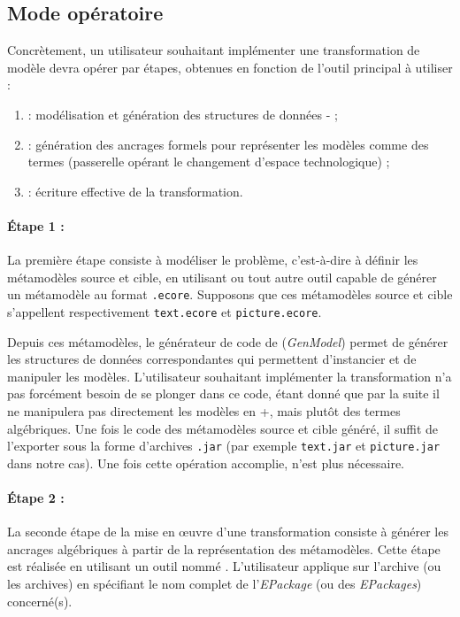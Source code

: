 \subsection{Mode opératoire}

Concrètement, un utilisateur souhaitant implémenter une transformation de
modèle devra opérer par étapes, obtenues en fonction de l'outil principal à
utiliser :
\begin{enumerate}

  \item {\eclipse} : modélisation et génération des structures de données
    {\java-\emf} ;

  \item {\tomemf} : génération des ancrages formels pour représenter les
    modèles comme des termes (passerelle opérant le changement d'espace
    technologique) ;

  \item {\tomjava} : écriture effective de la transformation.

\end{enumerate}

\paragraph{Étape 1 :} La première étape consiste à modéliser le problème,
c'est-à-dire à définir les métamodèles source et cible, en utilisant {\eclipse}
ou tout autre outil capable de générer un métamodèle au format \texttt{.ecore}.
Supposons que ces métamodèles source et cible s'appellent respectivement
\texttt{text.ecore} et \texttt{picture.ecore}.

Depuis ces métamodèles, le générateur de code de {\emf} (\emph{GenModel})
permet de générer les structures de données {\java} correspondantes qui
permettent d'instancier et de manipuler les modèles. L'utilisateur souhaitant
implémenter la transformation n'a pas forcément besoin de se plonger dans ce
code, étant donné que par la suite il ne manipulera pas directement les
modèles en {\java+\emf}, mais plutôt des termes algébriques. Une fois le
code des métamodèles source et cible généré, il suffit de l'exporter sous la
forme d'archives \texttt{.jar} (par exemple \texttt{text.jar} et
\texttt{picture.jar} dans notre cas). Une fois cette opération accomplie,
{\eclipse} n'est plus nécessaire.

\paragraph{Étape 2 :} La seconde étape de la mise en œuvre d'une transformation
consiste à générer les ancrages algébriques à partir de la représentation
{\emf} des métamodèles. Cette étape est réalisée en utilisant un outil nommé
{\tomemf}.  L'utilisateur applique {\tomemf} sur l'archive (ou les archives) en
spécifiant le nom complet de l'\emph{EPackage} (ou des \emph{EPackages})
concerné(s). 


